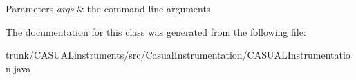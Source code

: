 \begin{DoxyParams}{Parameters}
{\em args} & the command line arguments \\
\hline
\end{DoxyParams}


The documentation for this class was generated from the following file\-:\begin{DoxyCompactItemize}
\item 
trunk/\-C\-A\-S\-U\-A\-Linstruments/src/\-Casual\-Instrumentation/C\-A\-S\-U\-A\-L\-Instrumentation.\-java\end{DoxyCompactItemize}
